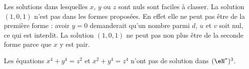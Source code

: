 \begin{remark}
	Les solutions dans lesquelles \( x\), \( y\) ou \( z\) sont nuls sont faciles à classer. La solution \( (1,0,1)\) n'est pas dans les formes proposées. En effet elle ne peut pas être de la première forme : avoir \( y=0\) demanderait qu'un nombre parmi \( d\), \( u\) et \( v\) soit nul, ce qui est interdit. La solution \( (1,0,1) \) ne peut pas non plus être de la seconde forme parce que \( x\) y est pair.
\end{remark}

\begin{proposition}      \label{propFKKKooFYQcxE}
	Les équations \( x^4+y^4=z^2\) et \( x^2+y^4=z^4\) n'ont pas de solution dans \( (\eN^*)^3\).
\end{proposition}

